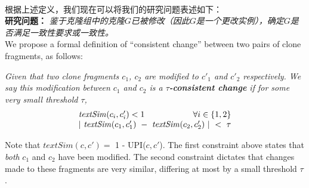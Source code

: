 ~\\
根据上述定义，我们现在可以将我们的研究问题表述如下：\\

\noindent
\textbf {研究问题：} {\em 鉴于克隆组中的克隆$ G $已被修改（因此$ G $是一个更改实例），确定$ G $是否满足一致性要求或一致性。 } \\




We propose a formal definition of ``consistent change'' between two pairs of clone fragments, as follows: 
\\

\begin{definition}  
\label{}
{\em 
Given that two clone fragments $c_1$, $c_2$ are modified to $c'_1$ and $c'_2$ respectively. We say this modification between $c_1$ and $c_2$ is a {\em\bf  $\tau$-consistent change\/} if for some very small threshold $\tau$, 
  \[
  \begin{array}[t]{lr}
    \mathit{textSim}(c_i, c'_i) < 1 & \forall i \in \{1,2\} \\
    \multicolumn{2}{c}{| ~\mathit{textSim}(c_1,c'_1)  ~-~ \mathit{textSim}(c_2,c'_2) ~| ~< ~ \tau}
  \end{array}
  \]
  } 
\end{definition}
  
Note that $\mathit{textSim}(c,c') =$ 1 - UPI($c,c'$). The first constraint above states that {\em both} $c_1$ and $c_2$ have been modified. The second constraint dictates that changes made to these fragments are very similar, differing at most by a small threshold $\tau$. 

